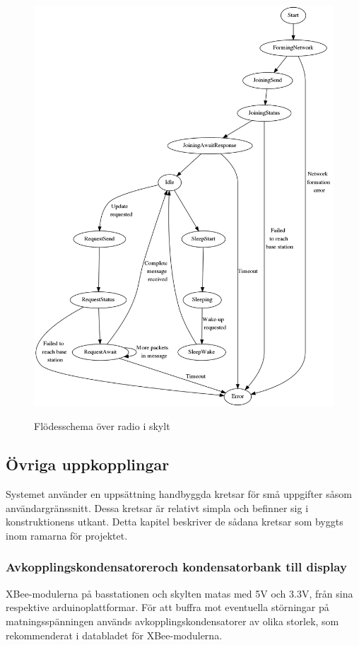 \documentclass[a4paper,11pt]{article}
\begin{document}
\begin{figure}[H]
\includegraphics[scale=0.3, angle=0]{skyltFSM.png}
\label{fig:radio_skylt}
\caption{Flödesschema över radio i skylt}
\end{figure}

\subsection{Övriga uppkopplingar}
Systemet använder en uppsättning handbyggda kretsar för små uppgifter såsom användargränssnitt. Dessa kretsar är relativt simpla och befinner sig i konstruktionens utkant. Detta kapitel beskriver de sådana kretsar som byggts inom ramarna för projektet.

\subsubsection{Avkopplingskondensatoreroch kondensatorbank till display}
XBee-modulerna på basstationen och skylten matas med 5V och 3.3V, från sina respektive arduinoplattformar. För att buffra mot eventuella störningar på matningsspänningen används avkopplingskondensatorer av olika storlek, som rekommenderat i databladet för XBee-modulerna. \\
\end{document}
